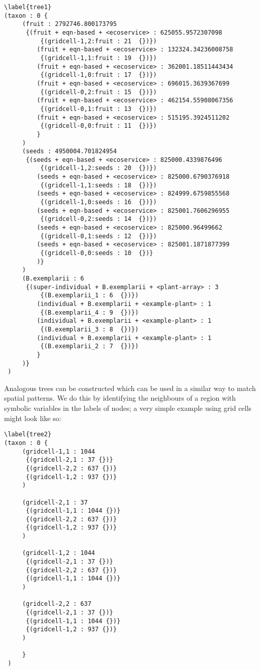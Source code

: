 \begin{verbatim}\label{tree1}
(taxon : 0 {
     (fruit : 2792746.800173795 
      {(fruit + eqn-based + <ecoservice> : 625055.9572307098 
          {(gridcell-1,2:fruit : 21  {})})
         (fruit + eqn-based + <ecoservice> : 132324.34236008758 
          {(gridcell-1,1:fruit : 19  {})})
         (fruit + eqn-based + <ecoservice> : 362001.18511443434 
          {(gridcell-1,0:fruit : 17  {})})
         (fruit + eqn-based + <ecoservice> : 696015.3639367699 
          {(gridcell-0,2:fruit : 15  {})})
         (fruit + eqn-based + <ecoservice> : 462154.55908067356 
          {(gridcell-0,1:fruit : 13  {})})
         (fruit + eqn-based + <ecoservice> : 515195.3924511202 
          {(gridcell-0,0:fruit : 11  {})})
         }
     )
     (seeds : 4950004.701824954 
      {(seeds + eqn-based + <ecoservice> : 825000.4339876496 
          {(gridcell-1,2:seeds : 20  {})})
         (seeds + eqn-based + <ecoservice> : 825000.6790376918 
          {(gridcell-1,1:seeds : 18  {})})
         (seeds + eqn-based + <ecoservice> : 824999.6759855568 
          {(gridcell-1,0:seeds : 16  {})})
         (seeds + eqn-based + <ecoservice> : 825001.7606296955 
          {(gridcell-0,2:seeds : 14  {})})
         (seeds + eqn-based + <ecoservice> : 825000.96499662 
          {(gridcell-0,1:seeds : 12  {})})
         (seeds + eqn-based + <ecoservice> : 825001.1871877399 
          {(gridcell-0,0:seeds : 10  {})}
         )}
     )
     (B.exemplarii : 6 
      {(super-individual + B.exemplarii + <plant-array> : 3 
          {(B.exemplarii_1 : 6  {})})
         (individual + B.exemplarii + <example-plant> : 1 
          {(B.exemplarii_4 : 9  {})})
         (individual + B.exemplarii + <example-plant> : 1 
          {(B.exemplarii_3 : 8  {})})
         (individual + B.exemplarii + <example-plant> : 1 
          {(B.exemplarii_2 : 7  {})})
         }
     )}
 )
\end{verbatim}

Analogous trees can be constructed which can be used in a similar way
to match spatial patterns. We do this by identifying the neighbours of
a region with symbolic variables in the labels of nodes; a very simple
example using grid cells might look like so:

\begin{verbatim}\label{tree2}
(taxon : 0 {
     (gridcell-1,1 : 1044
      {(gridcell-2,1 : 37 {})}
      {(gridcell-2,2 : 637 {})}
      {(gridcell-1,2 : 937 {})}
     )

     (gridcell-2,1 : 37
      {(gridcell-1,1 : 1044 {})}
      {(gridcell-2,2 : 637 {})}
      {(gridcell-1,2 : 937 {})}
     )

     (gridcell-1,2 : 1044
      {(gridcell-2,1 : 37 {})}
      {(gridcell-2,2 : 637 {})}
      {(gridcell-1,1 : 1044 {})}
     )

     (gridcell-2,2 : 637
      {(gridcell-2,1 : 37 {})}
      {(gridcell-1,1 : 1044 {})}
      {(gridcell-1,2 : 937 {})}
     )

     }
 )
\end{verbatim}

